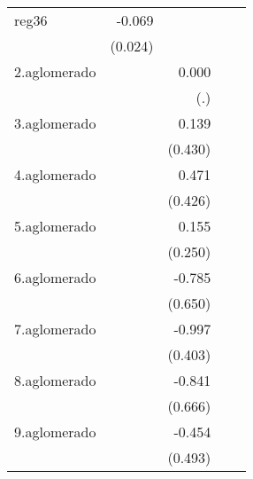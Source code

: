 {\begin{longtable}{l*{4}{D{.}{.}{-1}}}
\addlinespace
reg36       &      -0.069\sym{**} &                     &                     &                     \\
            &     (0.024)         &                     &                     &                     \\
\addlinespace
2.aglomerado&                     &       0.000         &                     &                     \\
            &                     &         (.)         &                     &                     \\
\addlinespace
3.aglomerado&                     &       0.139         &                     &                     \\
            &                     &     (0.430)         &                     &                     \\
\addlinespace
4.aglomerado&                     &       0.471         &                     &                     \\
            &                     &     (0.426)         &                     &                     \\
\addlinespace
5.aglomerado&                     &       0.155         &                     &                     \\
            &                     &     (0.250)         &                     &                     \\
\addlinespace
6.aglomerado&                     &      -0.785         &                     &                     \\
            &                     &     (0.650)         &                     &                     \\
\addlinespace
7.aglomerado&                     &      -0.997\sym{*}  &                     &                     \\
            &                     &     (0.403)         &                     &                     \\
\addlinespace
8.aglomerado&                     &      -0.841         &                     &                     \\
            &                     &     (0.666)         &                     &                     \\
\addlinespace
9.aglomerado&                     &      -0.454         &                     &                     \\
            &                     &     (0.493)         &                     &                     \\

\end{longtable}}
